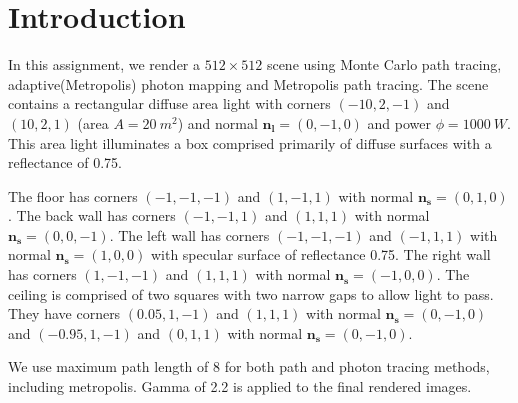 \section*{Introduction}
In this assignment, we render a $512\times 512$ scene using Monte Carlo path tracing, adaptive(Metropolis) photon mapping and Metropolis path tracing. The scene contains a rectangular diffuse area light with corners $(-10,2,-1)$ and $(10,2,1)$ (area $A=20\ m^2$) and normal $\mathbf{n_l}=(0,-1,0)$ and power $\phi=1000\ W$. This area light illuminates a box comprised primarily of diffuse surfaces with a reflectance of 0.75. 

The floor has corners $(-1,-1,-1)$ and $(1,-1,1)$ with normal $\mathbf{n_s}=(0,1,0)$. The back wall has corners $(-1,-1,1)$ and $(1,1,1)$ with normal $\mathbf{n_s}=(0,0,-1)$. The left wall has corners $(-1,-1,-1)$ and $(-1,1,1)$ with normal $\mathbf{n_s}=(1,0,0)$ with specular surface of reflectance 0.75. The right wall has corners $(1,-1,-1)$ and $(1,1,1)$ with normal $\mathbf{n_s}=(-1,0,0)$. The ceiling is comprised of two squares with two narrow gaps to allow light to pass. They have corners $(0.05,1,-1)$ and $(1,1,1)$ with normal $\mathbf{n_s}=(0,-1,0)$ and $(-0.95,1,-1)$ and $(0,1,1)$ with normal $\mathbf{n_s}=(0,-1,0)$. 

We use maximum path length of 8 for both path and photon tracing methods, including metropolis. Gamma of 2.2 is applied to the final rendered images. 
